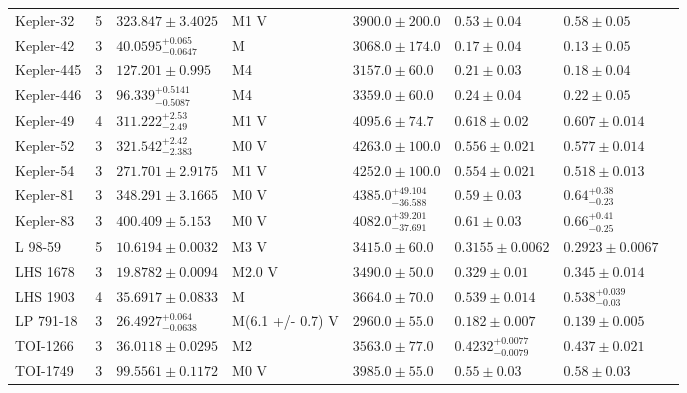 \begin{tabular}{lrllllll}
Kepler-32 & 5 & $323.847 \pm 3.4025$ & M1 V & $3900.0 \pm 200.0$ & $0.53 \pm 0.04$ & $0.58 \pm 0.05$ & \cite{FABRYCKY_ET_AL__2012} \\
Kepler-42 & 3 & $40.0595^{+0.065}_{-0.0647}$ & M & $3068.0 \pm 174.0$ & $0.17 \pm 0.04$ & $0.13 \pm 0.05$ & \cite{MUIRHEAD_ET_AL__2012} \\
Kepler-445 & 3 & $127.201 \pm 0.995$ & M4 & $3157.0 \pm 60.0$ & $0.21 \pm 0.03$ & $0.18 \pm 0.04$ & \cite{MUIRHEAD_ET_AL__2015} \\
Kepler-446 & 3 & $96.339^{+0.5141}_{-0.5087}$ & M4 & $3359.0 \pm 60.0$ & $0.24 \pm 0.04$ & $0.22 \pm 0.05$ & \cite{MUIRHEAD_ET_AL__2015} \\
Kepler-49 & 4 & $311.222^{+2.53}_{-2.49}$ & M1 V & $4095.6 \pm 74.7$ & $0.618 \pm 0.02$ & $0.607 \pm 0.014$ & \cite{LELEU_ET_AL__2023} \\
Kepler-52 & 3 & $321.542^{+2.42}_{-2.383}$ & M0 V & $4263.0 \pm 100.0$ & $0.556 \pm 0.021$ & $0.577 \pm 0.014$ & \cite{ROWE_ET_AL__2014} \\
Kepler-54 & 3 & $271.701 \pm 2.9175$ & M1 V & $4252.0 \pm 100.0$ & $0.554 \pm 0.021$ & $0.518 \pm 0.013$ & \cite{ROWE_ET_AL__2014} \\
Kepler-81 & 3 & $348.291 \pm 3.1665$ & M0 V & $4385.0^{+49.104}_{-36.588}$ & $0.59 \pm 0.03$ & $0.64^{+0.38}_{-0.23}$ & \cite{MORTON_ET_AL__2016} \\
Kepler-83 & 3 & $400.409 \pm 5.153$ & M0 V & $4082.0^{+39.201}_{-37.691}$ & $0.61 \pm 0.03$ & $0.66^{+0.41}_{-0.25}$ & \cite{MORTON_ET_AL__2016} \\
L 98-59 & 5 & $10.6194 \pm 0.0032$ & M3 V & $3415.0 \pm 60.0$ & $0.3155 \pm 0.0062$ & $0.2923 \pm 0.0067$ & \cite{CADIEUX_ET_AL_2025} \\
LHS 1678 & 3 & $19.8782 \pm 0.0094$ & M2.0 V & $3490.0 \pm 50.0$ & $0.329 \pm 0.01$ & $0.345 \pm 0.014$ & \cite{SILVERSTEIN_ET_AL__2022} \\
LHS 1903 & 4 & $35.6917 \pm 0.0833$ & M & $3664.0 \pm 70.0$ & $0.539 \pm 0.014$ & $0.538^{+0.039}_{-0.03}$ & \cite{WILSON_ET_AL_2026} \\
LP 791-18 & 3 & $26.4927^{+0.064}_{-0.0638}$ & M(6.1 +/- 0.7) V & $2960.0 \pm 55.0$ & $0.182 \pm 0.007$ & $0.139 \pm 0.005$ & \cite{PETERSON_ET_AL_2023} \\
TOI-1266 & 3 & $36.0118 \pm 0.0295$ & M2 & $3563.0 \pm 77.0$ & $0.4232^{+0.0077}_{-0.0079}$ & $0.437 \pm 0.021$ & \cite{GREKLEK_MCKEON_ET_AL_2025} \\
TOI-1749 & 3 & $99.5561 \pm 0.1172$ & M0 V & $3985.0 \pm 55.0$ & $0.55 \pm 0.03$ & $0.58 \pm 0.03$ & \cite{FUKUI_ET_AL__2021} \\

\end{tabular}
